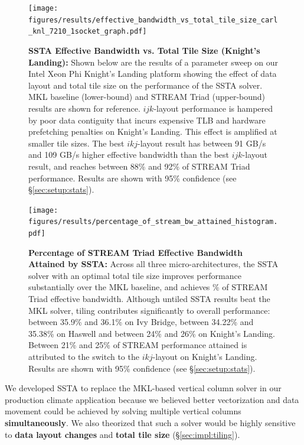 \documentclass[10pt, conference, compsocconf]{IEEEtran}
\newcommand{\textapprox}{\texttildelow}
\begin{document}
\begin{figure}[!h]
  \centering
  \caption{\small
    \textbf{SSTA Effective Bandwidth vs. Total Tile Size (Knight's Landing):}
    Shown below are the results of a parameter sweep on our Intel Xeon Phi
      Knight's Landing platform showing the effect of data layout and total
      tile size on the performance of the SSTA solver.
    MKL baseline (lower-bound) and STREAM Triad (upper-bound) results are shown
      for reference.
    \(ijk\)-layout performance is hampered by poor data contiguity that incurs
      expensive TLB and hardware prefetching penalties on Knight's Landing.
    This effect is amplified at smaller tile sizes.
    The best \(ikj\)-layout result has between 91 GB/s and 109 GB/s higher
      effective bandwidth than the best \(ijk\)-layout result, and reaches
      between 88\% and 92\% of STREAM Triad performance.
    Results are shown with 95\% confidence (see \S\ref{sec:setup:stats}).
  }
  \label{fig:results:bw_vs_tile_size_knl}
  \texttt{[image: figures/results/effective\_bandwidth\_vs\_total\_tile\_size\_carl\_knl\_7210\_1socket\_graph.pdf]}
\end{figure}

\begin{figure}[!h]
  \centering
  \caption{\small
    \textbf{Percentage of STREAM Triad Effective Bandwidth Attained by SSTA:}
    Across all three micro-architectures, the SSTA solver with an optimal total
      tile size improves performance substantially over the MKL baseline, and
      achieves \textapprox 90\% of STREAM Triad effective bandwidth.
    Although untiled SSTA results beat the MKL solver, tiling contributes
      significantly to overall performance: between 35.9\% and 36.1\% on 
      Ivy Bridge, between 34.22\% and 35.38\% on Haswell and between 24\% and
      26\% on Knight's Landing.
    Between 21\% and 25\% of STREAM performance attained is attributed to the
      switch to the \(ikj\)-layout on Knight's Landing. 
    Results are shown with 95\% confidence (see \S\ref{sec:setup:stats}).
  }
  \label{fig:results:percent_stream_bw}
  \texttt{[image: figures/results/percentage\_of\_stream\_bw\_attained\_histogram.pdf]}
\end{figure}

We developed SSTA to replace the MKL-based vertical column solver in our
  production climate application because we believed better vectorization and
  data movement could be achieved by solving multiple vertical columns
  \textbf{simultaneously}.
We also theorized that such a solver would be highly sensitive to
  \textbf{data layout changes} and
  \textbf{total tile size} (\S\ref{sec:impl:tiling}).
\end{document}

